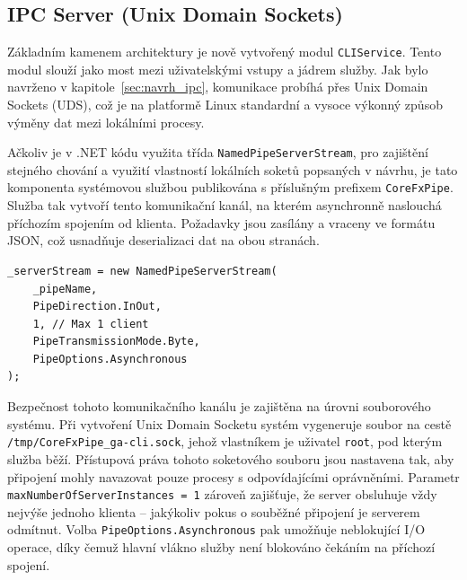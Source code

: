\subsection{IPC Server (Unix Domain Sockets)}
Základním kamenem architektury je nově vytvořený modul \texttt{CLIService}. Tento modul slouží jako most mezi uživatelskými vstupy a jádrem služby. Jak bylo navrženo v kapitole~\ref{sec:navrh_ipc}, komunikace probíhá přes Unix Domain Sockets (UDS), což je na platformě Linux standardní a vysoce výkonný způsob výměny dat mezi lokálními procesy.

Ačkoliv je v .NET kódu využita třída \texttt{NamedPipeServerStream}, pro zajištění stejného chování a využití vlastností lokálních soketů popsaných v návrhu, je tato komponenta systémovou službou publikována s příslušným prefixem \texttt{CoreFxPipe}. Služba tak vytvoří tento komunikační kanál, na kterém asynchronně naslouchá příchozím spojením od klienta. Požadavky jsou zasílány a vraceny ve formátu JSON, což usnadňuje deserializaci dat na obou stranách.


\noindent\begin{minipage}{\linewidth}
\begin{lstlisting}[language=CSharp, stringstyle=\itshape]
_serverStream = new NamedPipeServerStream(
    _pipeName,
    PipeDirection.InOut,
    1, // Max 1 client 
    PipeTransmissionMode.Byte,
    PipeOptions.Asynchronous
);
\end{lstlisting}
\end{minipage}

Bezpečnost tohoto komunikačního kanálu je zajištěna na úrovni souborového systému. Při vytvoření Unix Domain Socketu systém vygeneruje soubor na cestě \texttt{/tmp/CoreFxPipe\_ga-cli.sock}, jehož vlastníkem je uživatel \texttt{root}, pod kterým služba běží. Přístupová práva tohoto soketového souboru jsou nastavena tak, aby připojení mohly navazovat pouze procesy s odpovídajícími oprávněními. Parametr \texttt{maxNumberOfServerInstances~=~1} zároveň zajišťuje, že server obsluhuje vždy nejvýše jednoho klienta -- jakýkoliv pokus o souběžné připojení je serverem odmítnut. Volba \texttt{PipeOptions.Asynchronous} pak umožňuje neblokující I/O operace, díky čemuž hlavní vlákno služby není blokováno čekáním na příchozí spojení.

